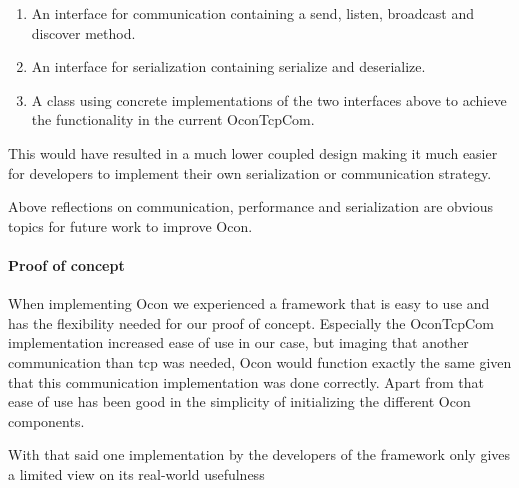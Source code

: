 \documentclass[../report.tex]{subfiles}
\begin{document}
\begin{enumerate}
\item An interface for communication containing a send, listen, broadcast and discover method.
\item An interface for serialization containing serialize and deserialize.
\item A class using concrete implementations of the two interfaces above to achieve the functionality in the current OconTcpCom.
\end{enumerate}

This would have resulted in a much lower coupled design making it much easier for developers to implement their own serialization or communication strategy.

Above reflections on communication, performance and serialization are obvious topics for future work to improve Ocon.

\paragraph{Proof of concept}
When implementing Ocon we experienced a framework that is easy to use and has the flexibility needed for our proof of concept. Especially the OconTcpCom implementation increased ease of use in our case, but imaging that another communication than tcp was needed, Ocon would function exactly the same given that this communication implementation was done correctly. Apart from that ease of use has been good in the simplicity of initializing the different Ocon components.

With that said one implementation by the developers of the framework only gives a limited view on its real-world usefulness
\end{document}
